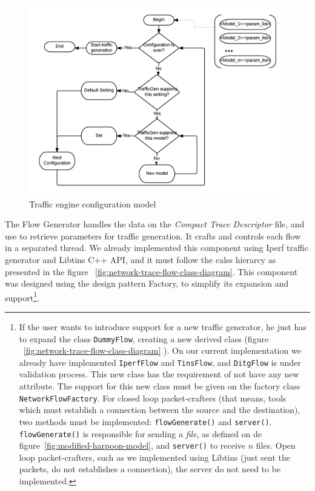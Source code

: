 \begin{figure}[ht!]
	\centering
	\includegraphics[width=\linewidth]{figures/alg-traffic-engine-config}
	\caption{Traffic engine configuration model}
	\label{fig:alg-traffic-engine-config}
\end{figure}


The Flow Generator handles the data on the \textit{Compact Trace Descriptor} file, and use to retrieve parameters for traffic generation. It crafts and controls each flow in a separated thread. We already implemented this component using Iperf traffic generator and Libtins C++ API, and it must follow the calss hierarcy as presented in the figure ~\ref{fig:network-trace-flow-class-diagram}.  This component was designed using the design pattern Factory, to simplify its expansion and support\footnote{If the user wants to introduce support for a new traffic generator, he just has to expand the class \texttt{DummyFlow}, creating a new derived class (figure ~\ref{fig:network-trace-flow-class-diagram} ). On our current implementation we already have implemented \texttt{IperfFlow} and \texttt{TinsFlow}, and \texttt{DitgFlow} is under validation process. This new class has the requirement of not have any new attribute. The support for this new class must be given on the factory class \texttt{NetworkFlowFactory}. For closed loop packet-crafters (that means, tools which must establish a connection between the source and the destination), two methods must be implemented: \texttt{flowGenerate()} and \texttt{server()}. \texttt{flowGenerate()} is responsible for sending a \textit{file}, as defined on de figure~\ref{fig:modified-harpoon-model}, and \texttt{server()} to receive $n$ files. Open loop packet-crafters, such as we implemented using Libtins (just sent the packets, do not establishes a connection), the server do not need to be implemented.}. 



